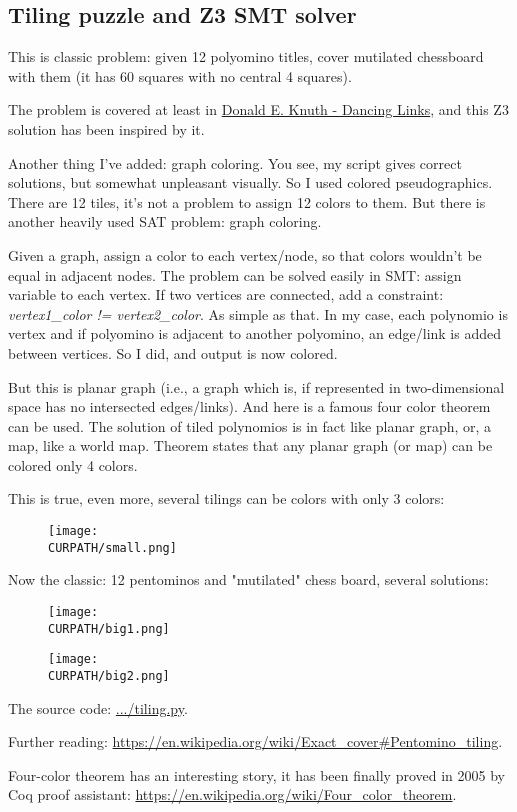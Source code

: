 \subsection{Tiling puzzle and Z3 SMT solver}
\label{tiling_Z3}

\renewcommand{\CURPATH}{other/tiling}

This is classic problem: given 12 polyomino titles, cover mutilated chessboard with them (it has 60 squares with no central 4 squares).

The problem is covered at least in \href{https://arxiv.org/pdf/cs/0011047.pdf}{Donald E. Knuth - Dancing Links},
and this Z3 solution has been inspired by it.

Another thing I've added: graph coloring. You see, my script gives correct solutions, but somewhat unpleasant visually.
So I used colored pseudographics. There are 12 tiles, it's not a problem to assign 12 colors to them.
But there is another heavily used SAT problem: graph coloring.

Given a graph, assign a color to each vertex/node, so that colors wouldn't be equal in adjacent nodes.
The problem can be solved easily in SMT: assign variable to each vertex.
If two vertices are connected, add a constraint: \textit{vertex1\_color != vertex2\_color}.
As simple as that.
In my case, each polynomio is vertex and if polyomino is adjacent to another polyomino, an edge/link is added between vertices.
So I did, and output is now colored.

But this is planar graph (i.e., a graph which is, if represented in two-dimensional space has no intersected edges/links).
And here is a famous four color theorem can be used.
The solution of tiled polynomios is in fact like planar graph, or, a map, like a world map.
Theorem states that any planar graph (or map) can be colored only 4 colors.

This is true, even more, several tilings can be colors with only 3 colors:

\begin{figure}[H]
\centering
\texttt{[image: \\CURPATH/small.png]}
\caption{}
\end{figure}

Now the classic: 12 pentominos and "mutilated" chess board, several solutions:

\begin{figure}[H]
\centering
\texttt{[image: \\CURPATH/big1.png]}
\caption{}
\end{figure}

\begin{figure}[H]
\centering
\texttt{[image: \\CURPATH/big2.png]}
\caption{}
\end{figure}

The source code: \url{.../tiling.py}.

Further reading: \url{https://en.wikipedia.org/wiki/Exact_cover#Pentomino_tiling}.

Four-color theorem has an interesting story, it has been finally proved in 2005 by Coq proof assistant:
\url{https://en.wikipedia.org/wiki/Four_color_theorem}.

